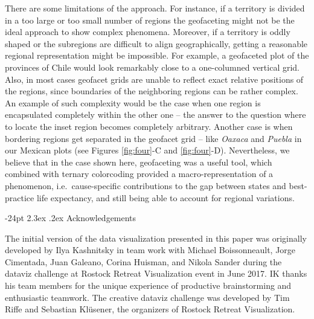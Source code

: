 \documentclass[10pt, twoside, parskip=half]{article}
\makeatletter
\renewcommand\section{\@startsection {section}{1}{\z@}%
                                   {-24pt}%
                                   {2.3ex \@plus.2ex}%
                                   {\normalfont\large\bfseries}}
\makeatother
\begin{document}
There are some limitations of the approach. For instance, if a territory is divided in a too large or too small number of regions the geofaceting might not be the ideal approach to show complex phenomena. Moreover, if a territory is oddly shaped or the subregions are difficult to align geographically, getting a reasonable regional representation might be impossible. For example, a geofaceted plot of the provinces of Chile would look remarkably close to a one-columned vertical grid. Also, in most cases geofacet grids are unable to reflect exact relative positions of the regions, since boundaries of the neighboring regions can be rather complex. An example of such complexity would be the case when one region is encapsulated completely within the other one -- the answer to the question where to locate the inset region becomes completely arbitrary. Another case is when bordering regions get separated in the geofacet grid -- like \emph{Oaxaca} and \emph{Puebla} in our Mexican plots (see Figures \ref{fig:four}-C and \ref{fig:four}-D). Nevertheless, we believe that in the case shown here, geofaceting was a useful tool, which combined with ternary colorcoding provided a macro-representation of a phenomenon, i.e.~cause-specific contributions to the gap between states and best-practice life expectancy, and still being able to account for regional variations.

\hypertarget{acknowledgements}{%
\section{Acknowledgements}\label{acknowledgements}}

The initial version of the data visualization presented in this paper was originally developed by Ilya Kashnitsky in team work with Michael Boissonneault, Jorge Cimentada, Juan Galeano, Corina Huisman, and Nikola Sander during the dataviz challenge at Rostock Retreat Visualization event in June 2017. IK thanks his team members for the unique experience of productive brainstorming and enthusiastic teamwork. The creative dataviz challenge was developed by Tim Riffe and Sebastian Klüsener, the organizers of Rostock Retreat Visualization.

\clearpage

\newpage


\end{document}
